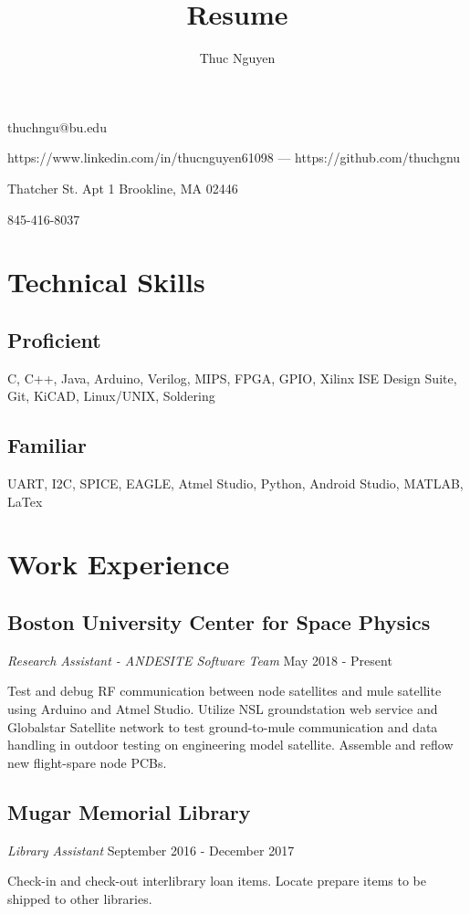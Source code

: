 \documentclass{article}
\makeatletter
\renewcommand{\maketitle}
{\begin{center}
{\huge\bfseries\theauthor}
\vspace{.5em}

thuchngu@bu.edu

https://www.linkedin.com/in/thucnguyen61098 --- https://github.com/thuchgnu

\end{center}}
\makeatother
\begin{document}
\title{Resume}
\author{Thuc Nguyen}
\maketitle
\vspace{-.5em}
{ Thatcher St. Apt 1 Brookline, MA 02446

845-416-8037

}
\vspace{-1.5em}
\section{Technical Skills}
\subsection{Proficient}
C, C++, Java, Arduino, Verilog, MIPS, FPGA, GPIO, Xilinx ISE Design Suite, Git, KiCAD, Linux/UNIX, Soldering
\vspace{-.75em}
\subsection{Familiar}
UART, I2C, SPICE, EAGLE, Atmel Studio, Python, Android Studio, MATLAB, LaTex

\vspace{-.75em}
\section{Work Experience}
\subsection{Boston University Center for Space Physics}  \textit{Research Assistant - ANDESITE Software Team}
  May 2018 - Present

Test and debug RF communication between node satellites and mule satellite using Arduino and Atmel Studio. Utilize NSL groundstation web service and Globalstar Satellite network to test ground-to-mule communication and data handling in outdoor testing on engineering model satellite. Assemble and reflow new flight-spare node PCBs.
\vspace{-.75em}
\subsection{Mugar Memorial Library} \textit{Library Assistant}
  September 2016 - December 2017

Check-in and check-out interlibrary loan items. Locate prepare items to be shipped to other libraries.
\vspace{-.75em}
\end{document}
